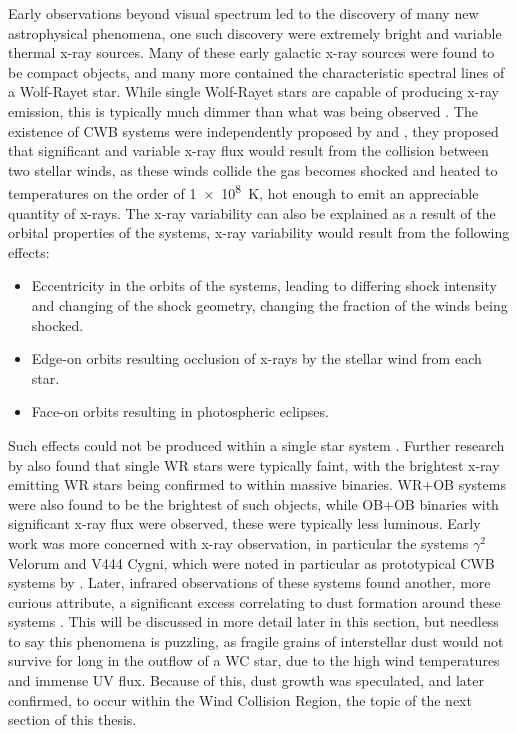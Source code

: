 Early observations beyond visual spectrum led to the discovery of many new astrophysical phenomena, one such discovery were extremely bright and variable thermal x-ray sources.
Many of these early galactic x-ray sources were found to be compact objects, and many more contained the characteristic spectral lines of a Wolf-Rayet star.
While single Wolf-Rayet stars are capable of producing x-ray emission, this is typically much dimmer than what was being observed 
\parencite{sewardXraysEtaCarinae1979}.
The existence of CWB systems were independently proposed by \textcite{prilutskii_x_1976} and \textcite{cherepashchukDetectabilityWolfRayetBinaries1976}, 
they proposed that significant and variable x-ray flux would result from the collision between two stellar winds, as these winds collide the gas becomes shocked and heated to temperatures on the order of \SI{1e8}{\kelvin}, hot enough to emit an appreciable quantity of x-rays.
The x-ray variability can also be explained as a result of the orbital properties of the systems, x-ray variability would result from the following effects:

\begin{itemize}
  \item Eccentricity in the orbits of the systems, leading to differing shock intensity and changing of the shock geometry, changing the fraction of the winds being shocked.
  \item Edge-on orbits resulting occlusion of x-rays by the stellar wind from each star. 
  \item Face-on orbits resulting in photospheric eclipses.
\end{itemize}

\noindent
Such effects could not be produced within a single star system \parencite{pittard_x-ray_1999}.
Further research by \textcite{pollockEinsteinViewWolfRayet1987} also found that single WR stars were typically faint, with the brightest x-ray emitting WR stars being confirmed to within massive binaries.
WR+OB systems were also found to be the brightest of such objects, while OB+OB binaries with significant x-ray flux were observed, these were typically less luminous.
Early work was more concerned with x-ray observation, in particular the systems $\gamma^2$ Velorum and V444 Cygni, which were noted in particular as prototypical CWB systems by \textcite{prilutskii_x_1976}.
Later, infrared observations of these systems found another, more curious attribute, a significant excess correlating to dust formation around these systems \parencite{williamsInfraredPhotometryLatetype1987}.
This will be discussed in more detail later in this section, but needless to say this phenomena is puzzling, as fragile grains of interstellar dust would not survive for long in the outflow of a WC star, due to the high wind temperatures and immense UV flux.
Because of this, dust growth was speculated, and later confirmed, to occur within the Wind Collision Region, the topic of the next section of this thesis.

